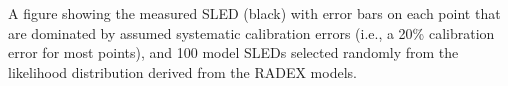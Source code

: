A figure showing the measured SLED (black) with error bars on each point that
are dominated by assumed systematic calibration errors (i.e., a 20\%
calibration error for most points), and 100 model SLEDs selected randomly from
the likelihood distribution derived from the RADEX models.

